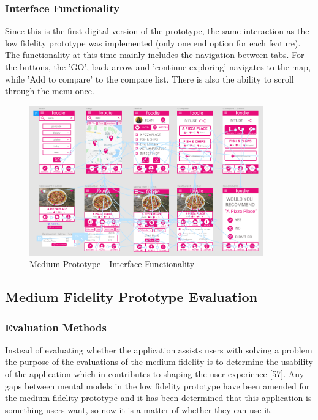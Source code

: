 \documentclass[a4 paper, 12pt]{article}
\begin{document}
        \subsubsection{Interface Functionality}
        Since this is the first digital version of the prototype, the same interaction as the low fidelity prototype was implemented (only one end option for each feature). The functionality at this time mainly includes the navigation between tabs. For the buttons, the 'GO', back arrow and 'continue exploring' navigates to the map, while 'Add to compare' to the compare list. There is also the ability to scroll through the menu once. 
        \begin{figure} [H]
            \centering
            \includegraphics[width=0.9\textwidth, frame]
                {./Med_Fidelity/Med_Report/images/med_proto_func.PNG}  
            \caption{Medium Prototype - Interface Functionality}
        \end{figure}


\subsection{Medium Fidelity Prototype Evaluation}

    \subsubsection{Evaluation Methods}
    Instead of evaluating whether the application assists users with solving a problem the purpose of the evaluations of the medium fidelity is to determine the usability of the application which in contributes to shaping the user experience [57]. Any gaps between mental models in the low fidelity prototype have been amended for the medium fidelity prototype and it has been determined that this application is something users want, so now it is a matter of whether they can use it.  
\end{document}
